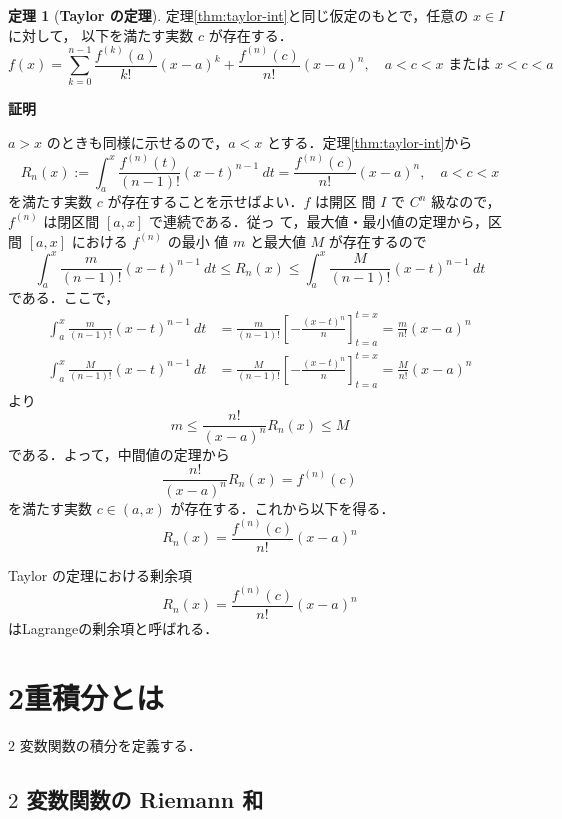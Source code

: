\documentclass[10pt, uplatex, dvipdfmx]{jsarticle}
\makeatletter
\renewenvironment{proof}[1][\proofname]{\par
  \pushQED{\qed}%
  \normalfont \topsep6\p@\@plus6\p@\relax
  \trivlist
  \item\relax
  {\bfseries
  #1\@addpunct{.}}\hspace\labelsep\ignorespaces
}{%
  \popQED\endtrivlist\@endpefalse
}
\theoremstyle{definition}
\newtheorem{theorem}{定理}[section]
\renewcommand{\proofname}{\textbf{証明}}
\numberwithin{equation}{section}
\makeatother
\begin{document}
\begin{theorem}[\textbf{Taylor の定理}]\label{thm:taylor}
  定理\ref{thm:taylor-int}と同じ仮定のもとで，任意の $x \in I$ に対して，
  以下を満たす実数 $c$ が存在する．
  \[
    f(x) = \sum_{k=0}^{n-1}\frac{f^{(k)}(a)}{k!}(x-a)^k
    +\frac{f^{(n)}(c)}{n!}(x-a)^n, \quad a<c<x \text{ または } x<c<a
  \]
\end{theorem}

\begin{proof}
  $a>x$ のときも同様に示せるので，$a<x$ とする．定理\ref{thm:taylor-int}から
  \[
    R_n(x):=\int_{a}^{x}\frac{f^{(n)}(t)}{(n-1)!}(x-t)^{n-1}\ dt =
    \frac{f^{(n)}(c)}{n!}(x-a)^n, \quad a<c<x
  \]
  を満たす実数 $c$ が存在することを示せばよい．$f$ は開区
  間 $I$ で $C^n$ 級なので，$f^{(n)}$ は閉区間 $[a,x]$ で連続である．従っ
  て，最大値・最小値の定理から，区間 $[a,x]$ における $f^{(n)}$ の最小
  値 $m$ と最大値 $M$ が存在するので
  \[
    \int_{a}^{x} \frac{m}{(n-1)!}(x-t)^{n-1}\ dt
    \leq R_n(x)
    \leq \int_{a}^{x} \frac{M}{(n-1)!}(x-t)^{n-1}\ dt
  \]
  である．ここで，
  \[
    \begin{aligned}
      \int_{a}^{x}\frac{m}{(n-1)!}(x-t)^{n-1}\ dt
      &= \frac{m}{(n-1)!}\left[ -\frac{(x-t)^{n}}{n}\right]_{t=a}^{t=x}
      =\frac{m}{n!}(x-a)^n\\ 
      \int_{a}^{x}\frac{M}{(n-1)!}(x-t)^{n-1}\ dt
      &=\frac{M}{(n-1)!}\left[ -\frac{(x-t)^{n}}{n}\right]_{t=a}^{t=x}=\frac{M}{n!}(x-a)^n
    \end{aligned}
  \]
  より
  \[
    m \leq \frac{n!}{(x-a)^n} R_n(x) \leq M
  \]
  である．よって，中間値の定理から
  \[
    \frac{n!}{(x-a)^n}R_n(x) =f^{(n)}(c)
  \]
  を満たす実数 $c \in (a,x)$ が存在する．これから以下を得る．
  \[
    R_n(x) = \frac{f^{(n)}(c)}{n!}(x-a)^n
  \]
\end{proof}

Taylor の定理における剰余項
\[
  R_n(x) = \frac{f^{(n)}(c)}{n!}(x-a)^n
\]
はLagrangeの剰余項と呼ばれる．


\newpage

\section{2重積分とは}

$2$ 変数関数の積分を定義する．

\subsection{$2$ 変数関数の Riemann 和}
\end{document}
